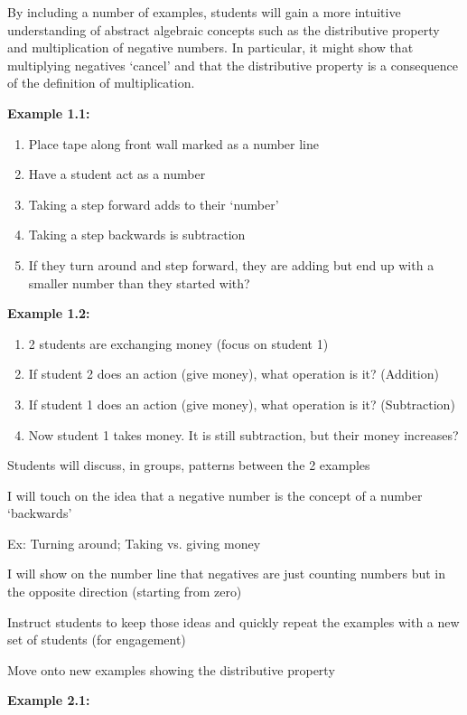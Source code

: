 \documentclass{notes}
\begin{document}
By including a number of examples, students will gain a more intuitive understanding of abstract algebraic concepts such as the distributive property and multiplication of negative numbers. In particular, it might show that multiplying negatives `cancel’ and that the distributive property is a consequence of the definition of multiplication.

\textbf{Example 1.1:}

\begin{enumerate}
    \item Place tape along front wall marked as a number line
    \item Have a student act as a number
    \item Taking a step forward adds to their `number'
    \item Taking a step backwards is subtraction
    \item If they turn around and step forward, they are adding but end up with a smaller number than they started with?
\end{enumerate}

\textbf{Example 1.2:}

\begin{enumerate}
    \item 2 students are exchanging money (focus on student 1)
    \item If student 2 does an action (give money), what operation is it? (Addition)
    \item If student 1 does an action (give money), what operation is it? (Subtraction)
    \item Now student 1 takes money. It is still subtraction, but their money increases?
\end{enumerate}

Students will discuss, in groups, patterns between the 2 examples

I will touch on the idea that a negative number is the concept of a number `backwards'

\tab Ex: Turning around; Taking vs. giving money

I will show on the number line that negatives are just counting numbers but in the opposite direction (starting from zero)

Instruct students to keep those ideas and quickly repeat the examples with a new set of students (for engagement)

Move onto new examples showing the distributive property

\textbf{Example 2.1:}
\end{document}
